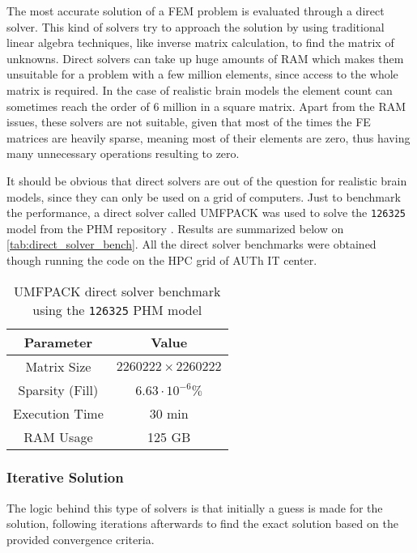 The most accurate solution of a \gls{FEM} problem is evaluated through a direct solver. This kind of solvers try to approach the solution by using traditional linear algebra techniques, like inverse matrix calculation, to find the matrix of unknowns. Direct solvers can take up huge amounts of \gls{RAM} which makes them unsuitable for a problem with a few million elements, since access to the whole matrix is required. In the case of realistic brain models the element count can sometimes reach the order of 6 million in a square matrix. Apart from the \gls{RAM} issues, these solvers are not suitable, given that most of the times the \gls{FE} matrices are heavily sparse, meaning most of their elements are zero, thus having many unnecessary operations resulting to zero.

It should be obvious that direct solvers are out of the question for realistic brain models, since they can only be used on a grid of computers. Just to benchmark the performance, a direct solver called \gls{UMFPACK} \cite{Davis2004_umfpack} was used to solve the \texttt{126325} model from the \gls{PHM} repository \cite{ErikG.Lee2016}. Results are summarized below on \autoref{tab:direct_solver_bench}. All the direct solver benchmarks were obtained though running the code on the \gls{HPC} grid of \gls{AUTh} \gls{IT} center.

\begin{table}[!ht]
	\centering
	\caption{\gls{UMFPACK} direct solver benchmark using the \texttt{126325} \gls{PHM} model}
	\label{tab:direct_solver_bench}
	\begin{tabular}{|c|c|}
		\hline
		\rowcolor[HTML]{C0C0C0} 
		\textbf{Parameter} & \textbf{Value} \\ \hline
		Matrix Size & $2260222\times 2260222$ \\ \hline
		Sparsity (Fill) & $6.63\cdot 10^{-6}\%$ \\ \hline
		Execution Time & 30 min \\ \hline
		RAM Usage & 125 GB \\ \hline
	\end{tabular}
\end{table}

\subsubsection{Iterative Solution}
\label{subsec:iterative_solvers}

The logic behind this type of solvers is that initially a guess is made for the solution, following iterations afterwards to find the exact solution based on the provided convergence criteria.

